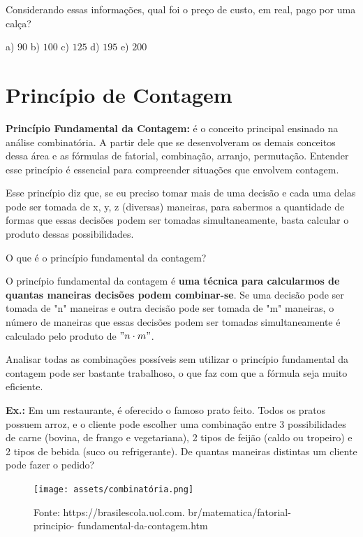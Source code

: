 \begin{multicols*}{2}
	Considerando essas informações, qual foi o preço de custo, em real, pago por uma calça?

	a) $90 $ b) $100 $ c) $125 $ d) $195 $ e) $200 $


	\section*{Princípio de Contagem}

	\textbf{Princípio Fundamental da Contagem:} é o  conceito principal ensinado na análise combinatória. A partir dele que se desenvolveram os demais conceitos dessa área e as fórmulas de fatorial, combinação, arranjo, permutação. Entender esse princípio é essencial para compreender situações que envolvem contagem.

	Esse princípio diz que, se eu preciso tomar mais de uma decisão e cada uma delas pode ser tomada de x, y, z (diversas) maneiras, para sabermos a quantidade de formas que essas decisões podem ser tomadas simultaneamente, basta calcular o produto dessas possibilidades.

	O que é o princípio fundamental da contagem?

	O princípio fundamental da contagem é \textbf{uma técnica para calcularmos de quantas maneiras decisões podem combinar-se}. Se uma decisão pode ser tomada de "n" maneiras e outra decisão pode ser tomada de "m" maneiras, o número de maneiras que essas decisões podem ser tomadas simultaneamente é calculado pelo produto de { $"n \cdot m"$}.

	Analisar todas as combinações possíveis sem utilizar o princípio fundamental da contagem pode ser bastante trabalhoso, o que faz com que a fórmula seja muito eficiente.

	\textbf{Ex.:} Em um restaurante, é oferecido o famoso prato feito. Todos os pratos possuem arroz, e o cliente pode escolher uma combinação entre 3 possibilidades de carne (bovina, de frango e vegetariana), 2 tipos de feijão (caldo ou tropeiro) e 2 tipos de bebida (suco ou refrigerante). De quantas maneiras distintas um cliente pode fazer o pedido?

	\begin{figure}[H]
		\centering
		\texttt{[image: assets/combinatória.png]}
		\caption*{Fonte: https://brasilescola.uol.com. br/matematica/fatorial-principio- fundamental-da-contagem.htm}
	\end{figure}


\end{multicols*}
